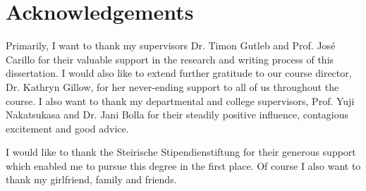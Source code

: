 \chapter*{Acknowledgements}

Primarily, I want to thank my supervisors Dr. Timon Gutleb and Prof. José Carillo for their valuable support in the research and writing process of this dissertation.
I would also like to extend further gratitude to our course director, Dr. Kathryn Gillow, for her never-ending support to all of us throughout the course.
I also want to thank my departmental and college supervisors, Prof. Yuji Nakatsukasa and Dr. Jani Bolla for their steadily positive influence, contagious excitement and good advice.

I would like to thank the Steirische Stipendienstiftung for their generous support which enabled me to pursue this degree in the first place.
Of course I also want to thank my girlfriend, family and friends.


